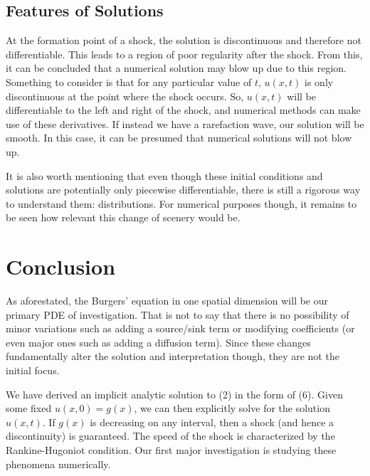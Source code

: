 \documentclass{myproject}
\begin{document}
\subsection{Features of Solutions}
At the formation point of a shock, the solution is discontinuous and therefore not differentiable. This leads to a region of poor regularity after the shock. From this, it can be concluded that a numerical solution may blow up due to this region. Something to consider is that for any particular value of $t$, $u(x, t)$ is only discontinuous at the point where the shock occurs. So, $u(x,t)$ will be differentiable to the left and right of the shock, and numerical methods can make use of these derivatives. If instead we have a rarefaction wave, our solution will be smooth. In this case, it can be presumed that numerical solutions will not blow up.

It is also worth mentioning that even though these initial conditions and solutions are potentially only piecewise differentiable, there is still a rigorous way to understand them: distributions. For numerical purposes though, it remains to be seen how relevant this change of scenery would be.

\section{Conclusion}

As aforestated, the Burgers' equation in one spatial dimension will be our primary PDE of investigation. That is not to say that there is no possibility of minor variations such as adding a source/sink term or modifying coefficients (or even major ones such as adding a diffusion term). Since these changes fundamentally alter the solution and interpretation though, they are not the initial focus. 

We have derived an implicit analytic solution to (2) in the form of (6). Given some fixed $u(x,0) = g(x)$, we can then explicitly solve for the solution $u(x,t)$. If $g(x)$ is decreasing on any interval, then a shock (and hence a discontinuity) is guaranteed. The speed of the shock is characterized by the Rankine-Hugoniot condition. Our first major investigation is studying these phenomena numerically.

\nocite{choksi2022}
\nocite{iserles2009}
\nocite{kutz2013}
\nocite{trefethen2001}
\nocite{learncfd}
\nocite{evans2010}
\printbibliography
\end{document}
